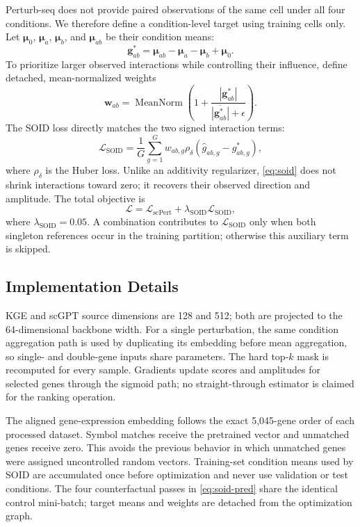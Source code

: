 \documentclass[conference]{IEEEtran}
\newcommand{\soid}{SOID}
\begin{document}
Perturb-seq does not provide paired observations of the same cell under all four
conditions. We therefore define a condition-level target using training cells
only. Let $\boldsymbol{\mu}_0$, $\boldsymbol{\mu}_a$,
$\boldsymbol{\mu}_b$, and $\boldsymbol{\mu}_{ab}$ be their condition means:
\begin{equation}
 \mathbf g^*_{ab}=\boldsymbol{\mu}_{ab}-\boldsymbol{\mu}_a-
 \boldsymbol{\mu}_b+\boldsymbol{\mu}_0.
 \label{eq:soid-target}
\end{equation}
To prioritize larger observed interactions while controlling their influence,
define detached, mean-normalized weights
\begin{equation}
 \mathbf w_{ab}=\operatorname{MeanNorm}\!\left(
 1+\frac{|\mathbf g^*_{ab}|}{\overline{|\mathbf g^*_{ab}|}+\epsilon}\right).
\end{equation}
The \soid{} loss directly matches the two signed interaction terms:
\begin{equation}
 \mathcal{L}_{\mathrm{SOID}}=\frac{1}{G}\sum_{g=1}^{G}w_{ab,g}
 \rho_\delta\!\left(\hat g_{ab,g}-g^*_{ab,g}\right),
 \label{eq:soid}
\end{equation}
where $\rho_\delta$ is the Huber loss. Unlike an additivity regularizer,
\eqref{eq:soid} does not shrink interactions toward zero; it recovers their
observed direction and amplitude. The total objective is
\begin{equation}
 \mathcal{L}=\mathcal{L}_{\mathrm{scPert}}+
 \lambda_{\mathrm{SOID}}\mathcal{L}_{\mathrm{SOID}},
\end{equation}
where $\lambda_{\mathrm{SOID}}=0.05$. A combination contributes to
$\mathcal{L}_{\mathrm{SOID}}$ only when both singleton references occur in the
training partition; otherwise this auxiliary term is skipped.

\subsection{Implementation Details}
KGE and scGPT source dimensions are 128 and 512; both are projected to the
64-dimensional backbone width. For a single perturbation, the same condition
aggregation path is used by duplicating its embedding before mean aggregation,
so single- and double-gene inputs share parameters. The hard top-$k$ mask is
recomputed for every sample. Gradients update scores and amplitudes for
selected genes through the sigmoid path; no straight-through estimator is
claimed for the ranking operation.

The aligned gene-expression embedding follows the exact 5,045-gene order of
each processed dataset. Symbol matches receive the pretrained vector and
unmatched genes receive zero. This avoids the previous behavior in which
unmatched genes were assigned uncontrolled random vectors. Training-set
condition means used by \soid{} are accumulated once before optimization and
never use validation or test conditions. The four counterfactual passes in
\eqref{eq:soid-pred} share the identical control mini-batch; target means and
weights are detached from the optimization graph.
\end{document}
